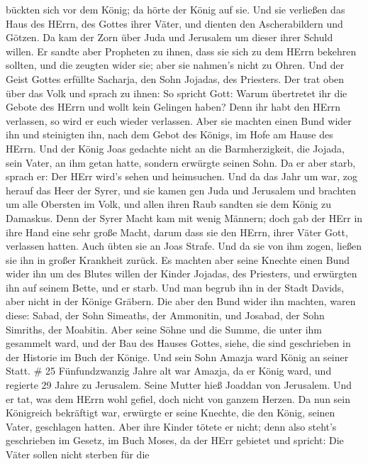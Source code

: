 bückten sich vor dem König; da hörte der König auf sie. 
Und sie verließen das Haus des HErrn, des Gottes ihrer Väter, und
dienten den Ascherabildern und Götzen. Da kam der Zorn über Juda und
Jerusalem um dieser ihrer Schuld willen.  Er sandte aber
Propheten zu ihnen, dass sie sich zu dem HErrn bekehren sollten, und die
zeugten wider sie; aber sie nahmen's nicht zu Ohren.  Und
der Geist Gottes erfüllte Sacharja, den Sohn Jojadas, des Priesters. Der
trat oben über das Volk und sprach zu ihnen: So spricht Gott: Warum
übertretet ihr die Gebote des HErrn und wollt kein Gelingen haben? Denn
ihr habt den HErrn verlassen, so wird er euch wieder verlassen.
 Aber sie machten einen Bund wider ihn und steinigten ihn,
nach dem Gebot des Königs, im Hofe am Hause des HErrn.  Und
der König Joas gedachte nicht an die Barmherzigkeit, die Jojada, sein
Vater, an ihm getan hatte, sondern erwürgte seinen Sohn. Da er aber
starb, sprach er: Der HErr wird's sehen und heimsuchen. 
Und da das Jahr um war, zog herauf das Heer der Syrer, und sie kamen gen
Juda und Jerusalem und brachten um alle Obersten im Volk, und allen
ihren Raub sandten sie dem König zu Damaskus.  Denn der
Syrer Macht kam mit wenig Männern; doch gab der HErr in ihre Hand eine
sehr große Macht, darum dass sie den HErrn, ihrer Väter Gott, verlassen
hatten. Auch übten sie an Joas Strafe.  Und da sie von ihm
zogen, ließen sie ihn in großer Krankheit zurück. Es machten aber seine
Knechte einen Bund wider ihn um des Blutes willen der Kinder Jojadas,
des Priesters, und erwürgten ihn auf seinem Bette, und er starb. Und man
begrub ihn in der Stadt Davids, aber nicht in der Könige Gräbern.
 Die aber den Bund wider ihn machten, waren diese: Sabad,
der Sohn Simeaths, der Ammonitin, und Josabad, der Sohn Simriths, der
Moabitin.  Aber seine Söhne und die Summe, die unter ihm
gesammelt ward, und der Bau des Hauses Gottes, siehe, die sind
geschrieben in der Historie im Buch der Könige. Und sein Sohn Amazja
ward König an seiner Statt. \# 25  Fünfundzwanzig Jahre alt
war Amazja, da er König ward, und regierte 29 Jahre zu Jerusalem. Seine
Mutter hieß Joaddan von Jerusalem.  Und er tat, was dem
HErrn wohl gefiel, doch nicht von ganzem Herzen.  Da nun
sein Königreich bekräftigt war, erwürgte er seine Knechte, die den
König, seinen Vater, geschlagen hatten.  Aber ihre Kinder
tötete er nicht; denn also steht's geschrieben im Gesetz, im Buch Moses,
da der HErr gebietet und spricht: Die Väter sollen nicht sterben für die
